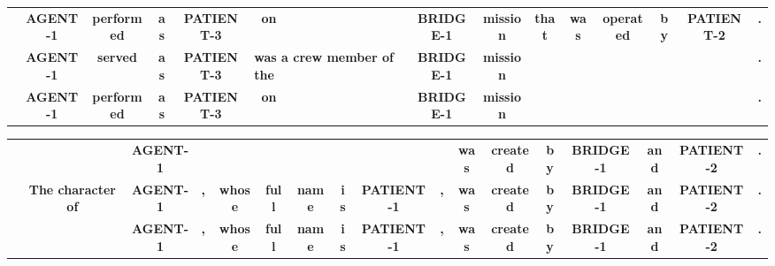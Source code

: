 \documentclass[11pt,a4paper]{article}
\newcommand{\orange}[1]{{\color[HTML]{ff7f0e}\textbf{#1}}}
\newcommand{\blue}[1]{{\color[HTML]{1f77b4}\textbf{#1}}}
\newcommand{\green}[1]{{\color[HTML]{2ca02c}\textbf{#1}}}
\newcommand{\gray}[1]{{\color[HTML]{808080}\textbf{#1}}}
\begin{document}
\begin{table*}[t]
    \centering
    \scriptsize
    \begin{subtable}[t]{\textwidth}
        \begin{tabular*}{\textwidth}{cc@{\quad}c@{\quad}c@{\quad}c@{\quad}c@{\quad}c@{\quad}c@{\quad}c@{\quad}c@{\quad}c@{\quad}c@{\quad}c@{\quad}c@{\quad}c@{\quad}c@{\quad}c@{\quad}c@{\quad}c@{\quad}c@{}}
                 &  \green{AGENT-1} & \blue{performed} & \green{as} & \green{PATIENT-3} & \blue{on} & & & & & & & \green{BRIDGE-1} & \green{mission} & \orange{that} & \orange{was} & \orange{operated} & \orange{by} & \orange{PATIENT-2} & \green{.}\\
             &  \green{AGENT-1} & \gray{served} & \green{as} & \green{PATIENT-3} & \multicolumn{7}{l}{\gray{was a crew member of the}} & \green{BRIDGE-1} & \green{mission} & & & &  & & \green{.}\\
                   &  \green{AGENT-1} & \blue{performed} & \green{as} & \green{PATIENT-3} & \blue{on} & & & & & & & \green{BRIDGE-1} & \green{mission} & & & & & & \green{.}
        \end{tabular*}
        \caption{Example for insertion. The revised template  and the reference template  share subsequences. The set of triple templates  is \{(BRIDGE-1, operator, PATIENT-2)\}. Our method removes ``that was operated by PATIENT-2'' from the revised template  to create the draft template .}
        \label{tab:insert}
    \end{subtable}
    \newline
    \vspace{1em}
    \newline
    \begin{subtable}[t]{\textwidth}
        \begin{tabular*}{\textwidth}{cc@{\quad}c@{\quad}c@{\quad}c@{\quad}c@{\quad}c@{\quad}c@{\quad}c@{\quad}c@{\quad}c@{\quad}c@{\quad}c@{\quad}c@{\quad}c@{\quad}c@{\quad}c@{\quad}c@{\quad}c@{}}
                 & & & & \green{AGENT-1} & & & & & & & & \green{was} & \green{created} & \green{by} & \green{BRIDGE-1} & \green{and} & \green{PATIENT-2} & \green{.}\\
             & \multicolumn{3}{c}{\gray{The character of}} & \green{AGENT-1} & \blue{,} & \blue{whose} & \blue{full} & \blue{name} & \blue{is} & \blue{PATIENT-1} & \blue{,} & \green{was} & \green{created} & \green{by} & \green{BRIDGE-1} & \green{and} & \green{PATIENT-2} & \green{.}\\
                 & & & & \green{AGENT-1} & \blue{,} & \blue{whose} & \blue{full} & \blue{name} & \blue{is} & \blue{PATIENT-1} & \blue{,} & \green{was} & \green{created} & \green{by} & \green{BRIDGE-1} & \green{and} & \green{PATIENT-2} & \green{.}\\

\end{tabular*}
\end{subtable}
\end{table*}
\end{document}
